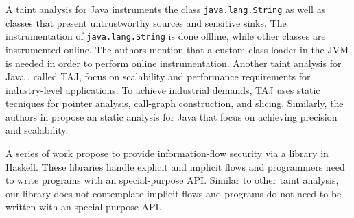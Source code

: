 \documentclass[oribibl]{llncs}
\begin{document}
A taint analysis for Java \cite{Haldar05dynamictaint} instruments
the class \texttt{java.lang.String} as well as  classes that 
present untrustworthy sources and sensitive sinks. 
The instrumentation of \texttt{java.lang.String} is done offline, 
while other classes are instrumented online. The authors 
mention that a custom class loader in the JVM is needed in order 
to perform online instrumentation. Another taint analysis 
for Java \cite{TrippPFSW09}, called TAJ, focus on scalability and 
performance requirements for industry-level applications.
To achieve industrial demands, TAJ uses
static tecniques for pointer analysis, call-graph construction, 
and slicing. Similarly, the authors in 
\cite{Livshits:Lam:USENIX} propose an static analysis 
for Java that focus on achieving precision and scalability.
 



A series of work 
\cite{PengLi+:Arrows,Tsai+:Library,Russo+:Haskell08} propose
to provide information-flow security via a library in Haskell. 
These libraries handle explicit and implicit flows and programmers
need to write programs with an special-purpose API.
Similar to other taint analysis, 
our library does not contemplate implicit flows %
and programs do not need to be written 
with an special-purpose API. 
\end{document}
